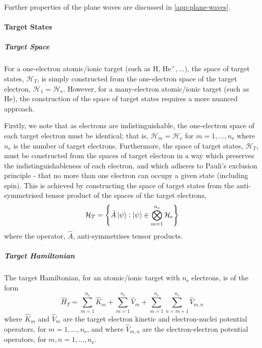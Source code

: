 \documentclass[draft]{article}
\begin{document}
Further properties of the plane waves are discussed in
\autoref{app:plane-waves}.

\paragraph{Target States}
\label{sec:target-states}

\subparagraph{Target Space}
\label{sec:target-space}


For a one-electron atomic/ionic target (such as H, $\mathrm{He}^{+}, \dotsc$),
the space of target states, $\mathcal{H}_{T}$, is simply constructed from the
one-electron space of the target electron,
$\mathcal{H}_{1} = \mathcal{H}_{\mathrm{e}}$.
However, for a many-electron atomic/ionic target (such as He), the construction
of the space of target states requires a more nuanced approach.

Firstly, we note that as electrons are indistinguishable, the one-electron space
of each target electron must be identical; that is,
$\mathcal{H}_{m} = \mathcal{H}_{\mathrm{e}}$ for
$m = 1, \dotsc, n_{\mathrm{e}}$ where $n_{\mathrm{e}}$ is the number of target
electrons.
Furthermore, the space of target states, $\mathcal{H}_{T}$, must be constructed
from the spaces of target electron in a way which preserves the
indistinguishableness of each electron, and which adheres to Pauli's exclusion
principle - that no more than one electron can occupy a given state (including
spin).
This is achieved by constructing the space of target states from the
anti-symmetrised tensor product of the spaces of the target electrons,
\begin{equation}
  \label{eq:target-space}
  \mathcal{H}_{T}
  =
  \lrset[\Bigg]
  {
    \hat{A}
    \ket{\psi}
    :
    \ket{\psi}
    \in
    \bigotimes_{m = 1}^{n_{\mathrm{e}}}
    \mathcal{H}_{\mathrm{e}}
  }
\end{equation}
where the operator, $\hat{A}$, anti-symmetrises tensor products.


\subparagraph{Target Hamiltonian}
\label{sec:target-hamiltonian}

The target Hamiltonian, for an atomic/ionic target with $n_{\mathrm{e}}$
electrons, is of the form
\begin{equation}
  \label{eq:target-hamiltonian}
  \hat{H}_{T}
  =
  \sum_{m = 1}^{n_{\mathrm{e}}}
  \hat{K}_{m}
  +
  \sum_{m = 1}^{n_{\mathrm{e}}}
  \hat{V}_{m}
  +
  \sum_{m = 1}^{n_{\mathrm{e}}}
  \sum_{n = m + 1}^{n_{\mathrm{e}}}
  \hat{V}_{m, n}
\end{equation}
where $\hat{K}_{m}$ and $\hat{V}_{m}$ are the target electron kinetic and
electron-nuclei potential operators, for $m = 1, \dotsc, n_{\mathrm{e}}$, and
where $\hat{V}_{m, n}$ are the electron-electron potential operators, for
$m, n = 1, \dotsc, n_{\mathrm{e}}$.
\end{document}
